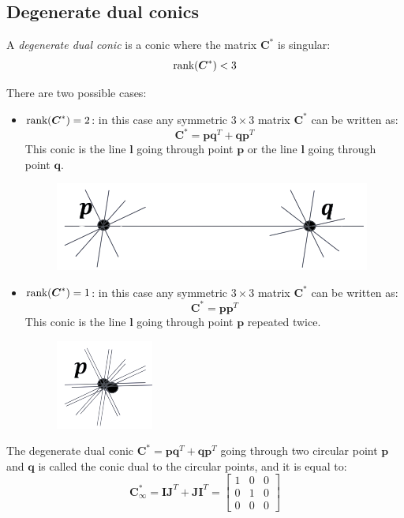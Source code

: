 \documentclass[12pt, a4paper]{report}
\newtheorem[style=M,bodystyle=\normalfont]{theorem}{Theorem}
\newtheorem[style=M,bodystyle=\normalfont]{corollary}{Corollary}
\newtheorem[style=M,bodystyle=\normalfont]{lemma}{Lemma}
\newtheorem[style=M,bodystyle=\normalfont]{definition}{Definition}
\begin{document}
    \subsection{Degenerate dual conics}
    \begin{definition}
        A \emph{degenerate dual conic} is a conic where the matrix $\boldsymbol{C}^{*}$ is singular: \[\textnormal{rank}(\boldsymbol{C}^{*}) < 3\]
    \end{definition}
    There are two possible cases: 
    \begin{itemize}
        \item $\textnormal{rank}(\boldsymbol{C}^{*}) = 2$: in this case any symmetric $3 \times 3$ matrix $\boldsymbol{C}^{*}$ can be written as:
            \[\boldsymbol{C}^{*}=\boldsymbol{pq}^T+\boldsymbol{qp}^T\]
            This conic is the line $\boldsymbol{l}$ going through point $\boldsymbol{p}$ or the line $\boldsymbol{l}$ going through point $\boldsymbol{q}$. 
            \begin{figure}[H]
                \centering
                \includegraphics[width=0.5\linewidth]{images/deg2.png}
            \end{figure}
        \item $\textnormal{rank}(\boldsymbol{C}^{*}) = 1$: in this case any symmetric $3 \times 3$ matrix $\boldsymbol{C}^{*}$ can be written as:
            \[\boldsymbol{C}^{*}=\boldsymbol{pp}^T\]
            This conic is the line $\boldsymbol{l}$ going through point $\boldsymbol{p}$ repeated twice. 
            \begin{figure}[H]
                \centering
                \includegraphics[width=0.2\linewidth]{images/deg1.png}
            \end{figure}
    \end{itemize}

    \begin{definition}
        The degenerate dual conic $\boldsymbol{C}^{*}=\boldsymbol{pq}^T+\boldsymbol{qp}^T$ going through two circular point $\boldsymbol{p}$ and $\boldsymbol{q}$ is called the conic dual to the 
        circular points, and it is equal to: 
        \[\boldsymbol{C}^{*}_{\infty}=\boldsymbol{IJ}^{T}+\boldsymbol{JI}^{T}=
        \begin{bmatrix}
            1 & 0 & 0 \\
            0 & 1 & 0 \\
            0 & 0 & 0 
        \end{bmatrix}\]
    \end{definition}
\end{document}
